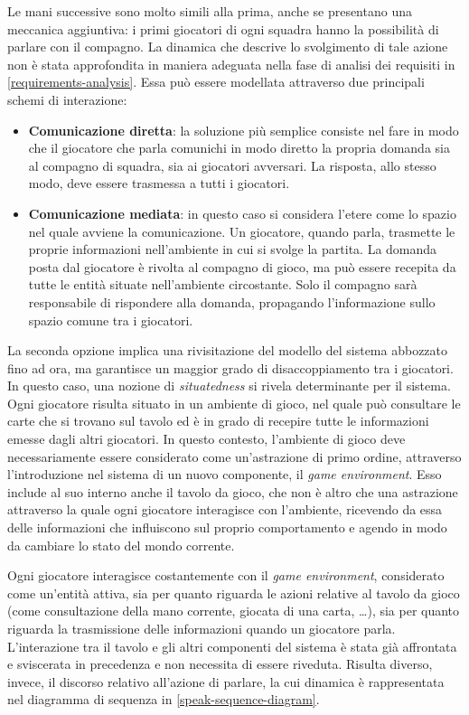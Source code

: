 \documentclass[a4paper,12pt]{article}
\begin{document}
Le mani successive sono molto simili alla prima, anche se presentano una meccanica aggiuntiva: i primi giocatori di ogni squadra hanno la possibilità di parlare con il compagno. La dinamica che descrive lo svolgimento di tale azione non è stata approfondita in maniera adeguata nella fase di analisi dei requisiti in \autoref{requirements-analysis}. Essa può essere modellata attraverso due principali schemi di interazione:
\begin{itemize}
	\item \textbf{Comunicazione diretta}: la soluzione più semplice consiste nel fare in modo che il giocatore che parla comunichi in modo diretto la propria domanda sia al compagno di squadra, sia ai giocatori avversari. La risposta, allo stesso modo, deve essere trasmessa a tutti i giocatori.
	\item \textbf{Comunicazione mediata}: in questo caso si considera l'etere come lo spazio nel quale avviene la comunicazione. Un giocatore, quando parla, trasmette le proprie informazioni nell'ambiente in cui si svolge la partita. La domanda posta dal giocatore è rivolta al compagno di gioco, ma può essere recepita da tutte le entità situate nell'ambiente circostante. Solo il compagno sarà responsabile di rispondere alla domanda, propagando l'informazione sullo spazio comune tra i giocatori.
\end{itemize}
La seconda opzione implica una rivisitazione del modello del sistema abbozzato fino ad ora, ma garantisce un maggior grado di disaccoppiamento tra i giocatori. In questo caso, una nozione di \emph{situatedness} si rivela determinante per il sistema. Ogni giocatore risulta situato in un ambiente di gioco, nel quale può consultare le carte che si trovano sul tavolo ed è in grado di recepire tutte le informazioni emesse dagli altri giocatori. In questo contesto, l'ambiente di gioco deve necessariamente essere considerato come un'astrazione di primo ordine, attraverso l'introduzione nel sistema di un nuovo componente, il \emph{game environment}. Esso include al suo interno anche il tavolo da gioco, che non è altro che una astrazione attraverso la quale ogni giocatore interagisce con l'ambiente, ricevendo da essa delle informazioni che influiscono sul proprio comportamento e agendo in modo da cambiare lo stato del mondo corrente. 

Ogni giocatore interagisce costantemente con il \emph{game environment}, considerato come un'entità attiva, sia per quanto riguarda le azioni relative al tavolo da gioco (come consultazione della mano corrente, giocata di una carta, \dots), sia per quanto riguarda la trasmissione delle informazioni quando un giocatore parla. L'interazione tra il tavolo e gli altri componenti del sistema è stata già affrontata e sviscerata in precedenza e non necessita di essere riveduta. Risulta diverso, invece, il discorso relativo all'azione di parlare, la cui dinamica è rappresentata nel diagramma di sequenza in \autoref{speak-sequence-diagram}.
\end{document}
